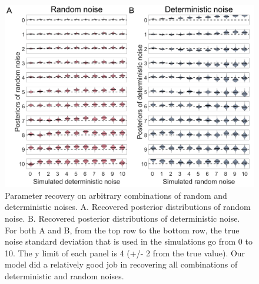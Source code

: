 \documentclass[12pt]{article}
\begin{document}
	\begin{figure}[hp]
		\begin{center}
			\includegraphics[width=1\textwidth]{figures/RDBayes_parameterrecovery_gridsimu_all.jpg}
			\caption{Parameter recovery on arbitrary combinations of random and deterministic noises. A. Recovered posterior distributions of random noise. B. Recovered posterior distributions of deterministic noise. For both A and B, from the top row to the bottom row, the true noise standard deviation that is used in the simulations go from 0 to 10. The y limit of each panel is 4 (+/- 2 from the true value). Our model did a relatively good job in recovering all combinations of deterministic and random noises.}
			\label{fig:s7}
		\end{center}
	\end{figure} 
\end{document}
